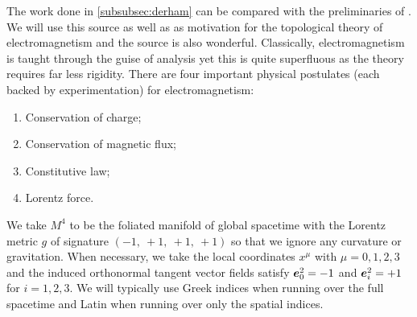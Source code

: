 \documentclass[conf]{new-aiaa}
\begin{document}
The work done in \cref{subsubsec:derham} can be compared with the preliminaries of \cite{delphenich_axioms_2005}. We will use this source as well as \cite{hehl_introduction_2003} as motivation for the topological theory of electromagnetism and the source \cite{gross_electromagnetic_2004} is also wonderful. Classically, electromagnetism is taught through the guise of analysis yet this is quite superfluous as the theory requires far less rigidity. There are four important physical postulates (each backed by experimentation) for electromagnetism:
\begin{enumerate}
    \item Conservation of charge;
    \item Conservation of magnetic flux;
    \item Constitutive law;
    \item Lorentz force.
\end{enumerate}
We take $M^4$ to be the foliated manifold of global spacetime with the Lorentz metric $g$ of signature $(-1, ~+1,~+1,~+1)$ so that we ignore any curvature or gravitation. When necessary, we take the local coordinates $x^\mu$ with $\mu=0,1,2,3$ and the induced orthonormal tangent vector fields satisfy $\boldsymbol{e}_0^2 = -1$ and $\boldsymbol{e}_i^2=+1$ for $i=1,2,3$. We will typically use Greek indices when running over the full spacetime and Latin when running over only the spatial indices.
\end{document}
